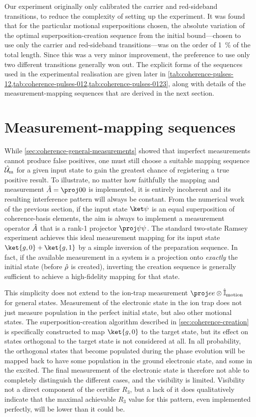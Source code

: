 Our experiment originally only calibrated the carrier and red-sideband transitions, to reduce the complexity of setting up the experiment.
It was found that for the particular motional superpositions chosen, the absolute variation of the optimal superposition-creation sequence from the initial bound---chosen to use only the carrier and red-sideband transitions---was on the order of \qty{1}{\percent} of the total length.
Since this was a very minor improvement, the preference to use only two different transitions generally won out.
The explicit forms of the sequences used in the experimental realisation are given later in \cref{tab:coherence-pulses-12,tab:coherence-pulses-012,tab:coherence-pulses-0123}, along with details of the measurement-mapping sequences that are derived in the next section.


\section{Measurement-mapping sequences}
\label{sec:coherence-mapping}

While \cref{sec:coherence-general-measurements} showed that imperfect measurements cannot produce false positives, one must still choose a suitable mapping sequence $\hat{\mathcal U}_{\text m}$ for a given input state to gain the greatest chance of registering a true positive result.
To illustrate, no matter how faithfully the mapping and measurement $\op A = \proj 00$ is implemented, it is entirely incoherent and its resulting interference pattern will always be constant.
From the numerical work of the previous section, if the input state $\ket\psi$ is an equal superposition of coherence-basis elements, the aim is always to implement a measurement operator $\hat{A}$ that is a rank-1 projector $\proj\psi\psi$.
The standard two-state Ramsey experiment achieves this ideal measurement mapping for its input state $\ket{g,0}+\ket{g,1}$ by a simple inversion of the preparation sequence.
In fact, if the available measurement in a system is a projection onto \emph{exactly} the initial state (before $\hat{\rho}$ is created), inverting the creation sequence is generally sufficient to achieve a high-fidelity mapping for that state.

This simplicity does not extend to the ion-trap measurement $\proj ee\otimes\I_{\text{motion}}$ for general states.
Measurement of the electronic state in the ion trap does not just measure population in the perfect initial state, but also other motional states.
The superposition-creation algorithm described in \cref{sec:coherence-creation} is specifically constructed to map $\ket{g,0}$ to the target state, but its effect on states orthogonal to the target state is not considered at all.
In all probability, the orthogonal states that become populated during the phase evolution will be mapped back to have some population in the ground electronic state, and some in the excited.
The final measurement of the electronic state is therefore not able to completely distinguish the different cases, and the visibility is limited.
Visibility not a direct component of the certifier $R_3$, but a lack of it does qualitatively indicate that the maximal achievable $R_3$ value for this pattern, even implemented perfectly, will be lower than it could be.

